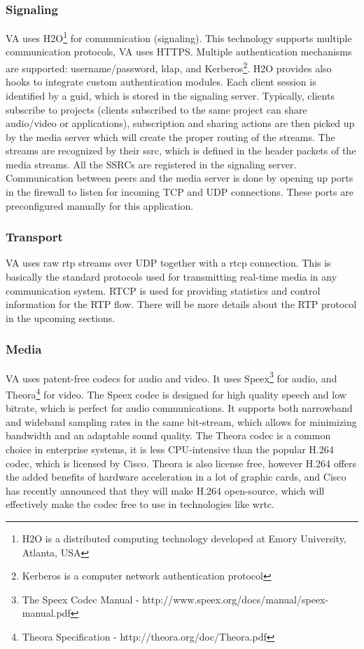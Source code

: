 \subsubsection{Signaling}
VA uses H2O\footnote{H2O is a distributed computing technology developed at Emory University, Atlanta, USA} for communication (signaling). This technology supports multiple communication protocols, VA uses HTTPS. Multiple authentication mechanisms are supported: username/password, \gls{ldap}, and Kerberos\footnote{Kerberos is a computer network authentication protocol}. H2O provides also hooks to integrate custom authentication modules. Each client session is identified by a \gls{guid}, which is stored in the signaling server. Typically, clients subscribe to projects (clients subscribed to the same project can share audio/video or applications), subscription and sharing actions are then picked up by the media server which will create the proper routing of the streams. The streams are recognized by their \gls{ssrc}, which is defined in the header packets of the media streams. All the SSRCs are registered in the signaling server. Communication between peers and the media server is done by opening up ports in the firewall to listen for incoming TCP and UDP connections. These ports are preconfigured manually for this application.

\subsubsection{Transport}
VA uses raw \gls{rtp} streams over UDP together with a \gls{rtcp} connection. This is basically the standard protocols used for transmitting real-time media in any communication system. RTCP is used for providing statistics and control information for the RTP flow. There will be more details about the RTP protocol in the upcoming sections.

\subsubsection{Media}
VA uses patent-free codecs for audio and video. It uses Speex\footnote{The Speex Codec Manual - http://www.speex.org/docs/manual/speex-manual.pdf} for audio, and Theora\footnote{Theora Specification - http://theora.org/doc/Theora.pdf} for video. The Speex codec is designed for high quality speech and low bitrate, which is perfect for audio communications. It supports both narrowband and wideband sampling rates in the same bit-stream\cite{speex}, which allows for minimizing bandwidth and an adaptable sound quality. The Theora codec is a common choice in enterprise systems, it is less CPU-intensive than the popular H.264 codec\cite{theora}, which is licensed by Cisco. Theora is also license free, however H.264 offers the added benefits of hardware acceleration in a lot of graphic cards, and Cisco has recently announced that they will make H.264 open-source\cite{h264-free}, which will effectively make the codec free to use in technologies like \gls{wrtc}.


